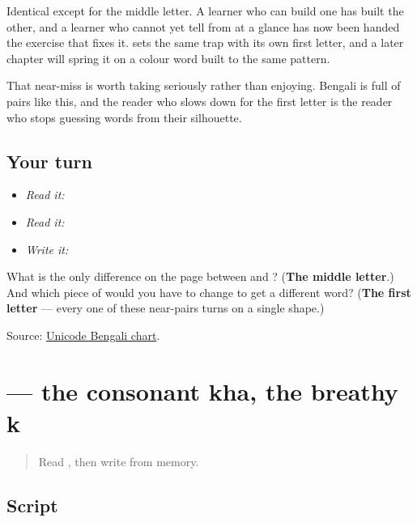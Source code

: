 Identical except for the middle letter. A learner who can build one has built the other, and a learner who cannot yet tell \textbf{} from \textbf{} at a glance has now been handed the exercise that fixes it. \textbf{} sets the same trap with its own first letter, and a later chapter will spring it on a colour word built to the same pattern.

That near-miss is worth taking seriously rather than enjoying. Bengali is full of pairs like this, and the reader who slows down for the first letter is the reader who stops guessing words from their silhouette.

\subsection*{Your turn}
\begin{itemize}
\raggedright
  \item \emph{Read it:} 
  \item \emph{Read it:}  
  \item \emph{Write it:} 
\end{itemize}

\begin{tcolorbox}[breakable,colback=teal!4,colframe=teal!35!black,title={Before you move on}]
What is the only difference on the page between \textbf{} and \textbf{}? (\textbf{The middle letter}.) And which piece of \textbf{} would you have to change to get a different word? (\textbf{The first letter} — every one of these near-pairs turns on a single shape.)

Source: \href{https://www.unicode.org/charts/PDF/U0980.pdf}{Unicode Bengali chart}.
\end{tcolorbox}
\section[\texorpdfstring{\bn{খ} (khô)}{খ (khô)}]{ — the consonant kha, the breathy k}

\label{lesson:BN-W03-kha}



\begin{quote}
Read \textbf{}, then write \textbf{} from memory.
\end{quote}

\subsection*{Script}

